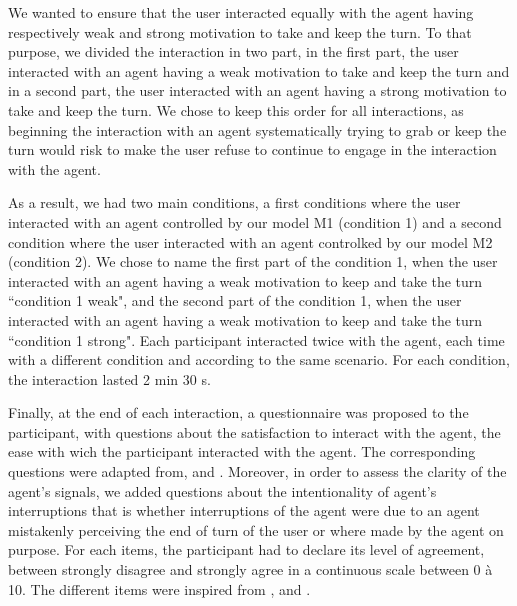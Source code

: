 We wanted to ensure that the user interacted equally with the agent having respectively weak and strong motivation to take and keep the turn. To that purpose, we divided the interaction in two part, in the first part, the user interacted with an agent having a weak motivation to take and keep the turn and in a second part, the user interacted with an agent having a strong motivation to take and keep the turn. We chose to keep this order for all interactions, as beginning the interaction with an agent systematically trying to grab or keep the turn would risk to make the user refuse to continue to engage in the interaction with the agent. 

As a result, we had two main conditions, a first conditions where the user interacted with an agent controlled by our model M1 (condition 1) and a second condition where the user interacted with an agent controlked by our model M2 (condition 2). We chose to name the first part of the condition 1, when the user interacted with an agent having a weak motivation to keep and take the turn ``condition 1 weak", and the second part of the condition 1, when the user interacted with an agent having a weak motivation to keep and take the turn ``condition 1 strong". 
Each participant interacted twice with the agent, each time with a different condition and according to the same scenario. For each condition, the interaction lasted 2 min 30 s. 

Finally, at the end of each interaction, a questionnaire was proposed to the participant, with questions about the satisfaction to interact with the agent, the ease with wich the participant interacted with the agent. The corresponding questions were adapted from\cite{skantze_towards_2010}, \cite{bevacqua_effects_2014} and \cite{de_vault_toward_2015}. Moreover, in order to assess the clarity of the agent's signals, we added questions about the intentionality of agent's interruptions that is whether interruptions of the agent were due to an agent mistakenly perceiving the end of turn of the user or where made by the agent on purpose. 
For each items, the participant had to declare its level of agreement, between strongly disagree and strongly agree in a continuous scale between 0 à 10. The different items were inspired from \cite{skantze_towards_2010}, \cite{bevacqua_effects_2014} and \cite{de_vault_toward_2015}.







